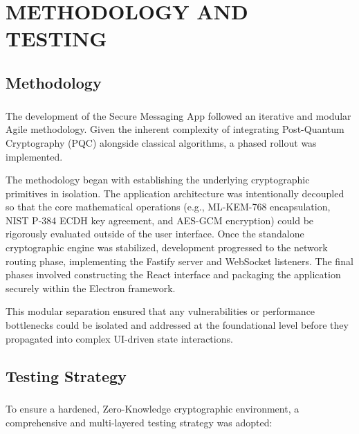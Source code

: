 \chapter{\MakeUppercase{Methodology and Testing}}

\section{Methodology}
\paragraph{}
The development of the Secure Messaging App followed an iterative and modular Agile methodology. Given the inherent complexity of integrating Post-Quantum Cryptography (PQC) alongside classical algorithms, a phased rollout was implemented. 

The methodology began with establishing the underlying cryptographic primitives in isolation. The application architecture was intentionally decoupled so that the core mathematical operations (e.g., ML-KEM-768 encapsulation, NIST P-384 ECDH key agreement, and AES-GCM encryption) could be rigorously evaluated outside of the user interface. Once the standalone cryptographic engine was stabilized, development progressed to the network routing phase, implementing the Fastify server and WebSocket listeners. The final phases involved constructing the React interface and packaging the application securely within the Electron framework.

This modular separation ensured that any vulnerabilities or performance bottlenecks could be isolated and addressed at the foundational level before they propagated into complex UI-driven state interactions.

\section{Testing Strategy}
\paragraph{}
To ensure a hardened, Zero-Knowledge cryptographic environment, a comprehensive and multi-layered testing strategy was adopted:

